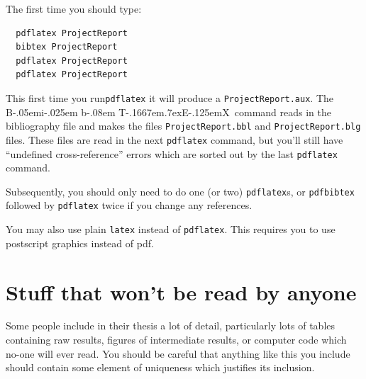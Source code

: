 \documentclass[12pt,a4paper]{report}
\def\BibTeX{{\rm B\kern-.05em{\sc i\kern-.025em b}\kern-.08em
    T\kern-.1667em\lower.7ex\hbox{E}\kern-.125emX}}
\begin{document}
The first time you should type:
\begin{verbatim}
  pdflatex ProjectReport
  bibtex ProjectReport
  pdflatex ProjectReport
  pdflatex ProjectReport
\end{verbatim} 
This first time you run\texttt{pdflatex} it will produce a
\texttt{ProjectReport.aux}.  The \BibTeX\ command reads in the
bibliography file and makes the files \texttt{ProjectReport.bbl} and
\texttt{ProjectReport.blg} files.  These files are read in the next
\texttt{pdflatex} command, but you'll still have ``undefined
cross-reference'' errors which are sorted out by the last
\texttt{pdflatex} command.

Subsequently, you should only need to do one (or two)
\texttt{pdflatex}s, or \texttt{pdfbibtex} followed by
\texttt{pdflatex} twice if you change any references.

\vspace{5mm} You may also use plain \texttt{latex} instead of
\texttt{pdflatex}.  This requires you to use postscript graphics
instead of pdf.




\chapter{Stuff that won't be read by anyone}

Some people include in their thesis a lot of detail, particularly lots
of tables containing raw results, figures of intermediate results, or
computer code which no-one will ever read. You should be careful that
anything like this you include should contain some element of
uniqueness which justifies its inclusion.


\newpage



\end{document}
